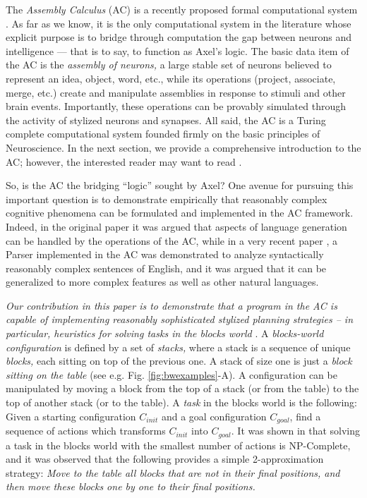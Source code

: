 \documentclass[letterpaper]{article}
\begin{document}
The \emph{Assembly Calculus} (AC) is a recently proposed formal computational system  \cite{papadimitriou2020}. As far as we know, it is the only computational system in the literature whose explicit purpose is to bridge through computation the gap between neurons and intelligence --- that is to say, to function as  Axel's logic.  The basic data item of the AC is the {\em assembly of neurons,} a large stable set of neurons believed to represent an idea, object, word, etc., while its operations (project, associate, merge, etc.) create and manipulate assemblies in response to stimuli and other brain events.  Importantly, these operations can be provably simulated through the activity of stylized neurons and synapses.  All said, the AC is a Turing complete computational system founded firmly on the basic principles of Neuroscience. In the next section, we provide a comprehensive introduction to the AC; however, the interested reader may want to read \cite{papadimitriou2020}.

So, is the AC the bridging ``logic'' sought by Axel?  One avenue for pursuing this important question is to demonstrate empirically that reasonably complex cognitive phenomena can be formulated and implemented in the AC framework. Indeed, in the original paper \cite{papadimitriou2020} it was argued that aspects of language generation can be handled by the operations of the AC, while in a very recent paper \cite{mitropolsky_biologically_2021}, a Parser implemented in the AC was demonstrated to analyze syntactically reasonably complex sentences of English, and it was argued that it can be generalized to more complex features as well as  other natural languages.

{\em Our contribution in this paper is to demonstrate that a program in the AC is capable of implementing reasonably sophisticated stylized planning strategies -- in particular, heuristics for solving tasks in the blocks world} \cite{gupta1991,slaney2001}.
A \emph{blocks-world configuration} is defined by a set of {\em stacks,} where a stack is a sequence of unique {\em blocks,} each sitting on top of the previous one.  A stack of size one is just a {\em block sitting on the table} (see e.g. Fig. \ref{fig:bwexamples}-A). 
A configuration can be manipulated by moving a block from the top of a stack (or from the table) to the top of another stack (or to the table).  A {\em task} in the blocks world is the following:  Given a
starting configuration $C_{init}$ and a goal configuration $C_{goal}$, 
find a sequence of actions which transforms $C_{init}$ into $C_{goal}$.
It was shown in \cite{gupta1992} that solving a task in the blocks world with the smallest number of actions is NP-Complete, and it was observed that the following provides a simple 2-approximation strategy: 
{\em Move to the table all blocks that are not in their final positions, and then move these blocks one by one to their final positions.}
\end{document}
